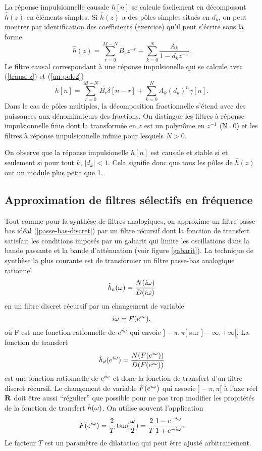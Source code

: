 La r\'eponse impulsionnelle causale $h[n]$ se calcule
facilement en d\'ecomposant $\hat h (z)$ en \'el\'ements simples.
Si $\hat h (z)$ a des p\^oles simples situ\'es
en $d_k$, on peut montrer par identification des coefficients
(exercice) qu'il peut s'\'ecrire sous la forme
\[
\hat h (z) = \sum_{r=0}^{M-N} B_r z^{-r} +
\sum_{k=0}^{N} \frac {A_k} {1 - d_k z^{-1}} .
\]
Le filtre causal correspondant \`a une r\'eponse impulsionelle
qui se calcule avec (\ref{transl-z}) et (\ref{un-pole2})
\[
h[n] =
\sum_{r=0}^{M-N} B_r \delta[n-r] +
\sum_{k=0}^{N} {A_k} (d_k)^n \gamma[n] .
\]
Dans le cas de p\^oles multiples, la d\'ecomposition fractionnelle
s'\'etend avec des puissances aux d\'enominateurs des fractions.
On distingue les filtres \`a r\'eponse impulsionnelle finie
dont la transform\'ee en $z$ est un polyn\^{o}me en $z^{-1}$ (N=0)
et les filtres \`a r\'eponse impulsionnelle infinie pour lesquels
$N > 0$.

On observe que la r\'eponse impulsionelle $h[n]$ est
causale et stable si et seulement si pour tout $k$, $|d_k| < 1$.
Cela signifie donc que tous les p\^oles de $\hat h (z)$ ont
un module plus petit que 1.

\subsection{Approximation de filtres s\'electifs en fr\'equence}

Tout comme pour la synth\`ese de filtres analogiques, on
approxime un filtre passe-bas id\'eal (\ref{passe-bas-discret})
par un filtre r\'ecursif dont la fonction de transfert satisfait
les conditions impos\'es par un
gabarit qui limite les oscillations dans
la bande passante et la bande d'att\'enuation
(voir figure \ref{gabarit}).
La technique de synth\`ese la plus courante
est de transformer un filtre passe-bas analogique rationnel
\[
\hat h_a ({\omega}) = \frac {N(i{\omega})} {D(i {\omega})}
\]
en un filtre discret r\'ecursif par un changement de variable
\[
i{\omega} = F({e ^{i \omega}}) ,
\]
o\`u F est une fonction rationnelle de ${e ^{i \omega}}$ qui envoie
$]-\pi,\pi[$ sur
$]-\infty,+\infty[$.
La fonction de transfert
\[
\hat h_d ({e ^{i \omega}}) = \frac {N(F({e ^{i \omega}}))} {D(F({e ^{i \omega}}))}
\]
est une fonction rationnelle de ${e ^{i \omega}}$
et donc la fonction de transfert
d'un filtre discret r\'ecursif.
Le changement de variable $F({e ^{i \omega}})$ qui associe
$]-\pi,\pi[$ \`a l'axe r\'eel ${\bf{R}}$ doit \^etre aussi ``r\'egulier''
que possible pour ne pas trop modifier les propri\'et\'es
de la fonction de transfert $\hat h({\omega})$.
On utilise souvent l'application
\[
F({e ^{i \omega}}) = \frac 2 T \tan (\frac {{\omega}} 2 ) =
\frac {2} T \frac{1 - e^{-i{\omega}}}{1 + e^{-i{\omega}}} .
\]
Le facteur $T$ est un param\`etre de dilatation qui peut \^etre
ajust\'e arbitrairement.


